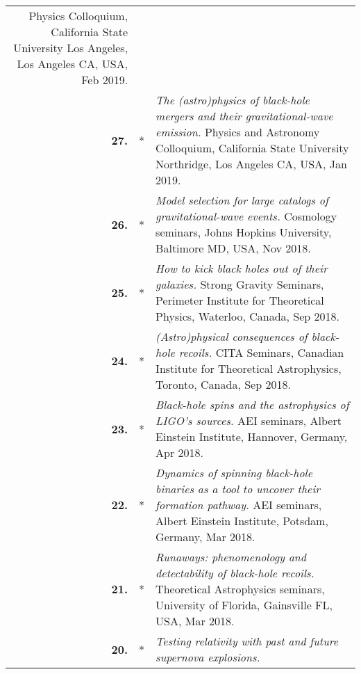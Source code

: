 {\begin{longtable}{rp{0.3cm}p{15.8cm}}
Physics Colloquium, California State University Los Angeles, Los Angeles CA, USA, Feb 2019.
\vspace{0.05cm}\\
%
\textbf{27.} & * & \textit{The (astro)physics of black-hole mergers and their gravitational-wave emission.}
\newline{}
Physics and Astronomy Colloquium, California State University Northridge, Los Angeles CA, USA, Jan 2019.
\vspace{0.05cm}\\
%
\textbf{26.} & * & \textit{Model selection for large catalogs of gravitational-wave events.}
\newline{}
Cosmology seminars, Johns Hopkins University, Baltimore MD, USA, Nov 2018.
\vspace{0.05cm}\\
%
\textbf{25.} & * & \textit{How to kick black holes out of their galaxies.}
\newline{}
Strong Gravity Seminars, Perimeter Institute for Theoretical Physics, Waterloo, Canada, Sep 2018.
\vspace{0.05cm}\\
%
\textbf{24.} & * & \textit{(Astro)physical consequences of black-hole recoils.}
\newline{}
CITA Seminars, Canadian Institute for Theoretical Astrophysics, Toronto, Canada, Sep 2018.
\vspace{0.05cm}\\
%
\textbf{23.} & * & \textit{Black-hole spins and the astrophysics of LIGO's sources.}
\newline{}
AEI seminars, Albert Einstein Institute, Hannover, Germany, Apr 2018.
\vspace{0.05cm}\\
%
\textbf{22.} & * & \textit{Dynamics of spinning black-hole binaries as a tool to uncover their formation pathway.}
\newline{}
AEI seminars, Albert Einstein Institute, Potsdam, Germany, Mar 2018.
\vspace{0.05cm}\\
%
\textbf{21.} & * & \textit{Runaways: phenomenology and detectability of black-hole recoils.}
\newline{}
Theoretical Astrophysics seminars, University of Florida, Gainsville FL, USA, Mar 2018.
\vspace{0.05cm}\\
%
\textbf{20.} & * & \textit{Testing relativity with past and future supernova explosions.}
\newline{}

\end{longtable}}
